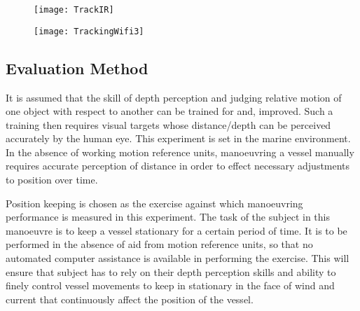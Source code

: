 \begin{figure}[linewidth]
	\centering
	\texttt{[image: TrackIR]}
	\caption{}
	\label{fig:eiffel_marker}
\end{figure}

\begin{figure}[linewidth]
	\centering
	\texttt{[image: TrackingWifi3]}
	\caption{}
	\label{fig:eiffel_marker}
\end{figure}

%
%

\subsection{Evaluation Method}

It is assumed that the skill of depth perception and judging relative motion of one object with respect to another can be trained for and, improved. Such a training then requires visual targets whose distance/depth can be perceived accurately by the human eye. This experiment is set in the marine environment. In the absence of working motion reference units, manoeuvring a vessel manually requires accurate perception of distance in order to effect necessary adjustments to position over time. 


Position keeping is chosen as the exercise against which manoeuvring performance is measured in this experiment. The task of the subject in this manoeuvre is to keep a vessel stationary for a certain period of time. It is to be performed in the absence of aid from motion reference units, so that no automated computer assistance is available in performing the exercise. This will ensure that subject has to rely on their depth perception skills and ability to finely control vessel movements to keep in stationary in the face of wind and current that continuously affect the position of the vessel. 


